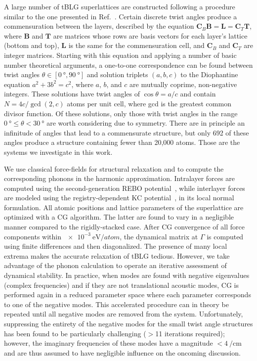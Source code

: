 \documentclass[prl,preprint]{revtex4}
\newcommand{\wavenumber}{\per\cm}
\newcommand{\mat}[1]{\mathbf{#1}}
\begin{document}
A large number of tBLG superlattices are constructed following a procedure similar to the one presented in Ref.~.  Certain discrete twist angles produce a commensuration between the layers, described by the equation $\mat C_B \mat B = \mat L = \mat C_T \mat T$, where $\mat B$ and $\mat T$ are matrices whose rows are basis vectors for each layer's lattice (bottom and top), $\mat L$ is the same for the commensuration cell, and $\mat C_B$ and $\mat C_T$ are integer matrices. Starting with this equation and applying a number of basic number theoretical arguments, a one-to-one correspondence can be found between twist angles $\theta \in \left[\SI{0}{\degree}, \SI{90}{\degree}\right]$ and solution triplets $(a, b, c)$ to the Diophantine equation $a^2 + 3b^2 = c^2$, where $a$, $b$, and $c$ are mutually coprime, non-negative integers. These solutions have twist angles of $\cos \theta=a/c$ and contain $N=4c/\gcd(2, c)$ atoms per unit cell, where gcd is the greatest common divisor function. Of these solutions, only those with twist angles in the range $\SI{0}{\degree} \leq \theta < \SI{30}{\degree}$ are worth considering due to symmetry. There are in principle an infinitude of angles that lead to a commensurate structure, but only 692 of these angles produce a structure containing fewer than 20,000 atoms. Those are the systems we investigate in this work.

We use classical force-fields for structural relaxation and to compute the corresponding phonons in the harmonic approximation. Intralayer forces are computed using the second-generation REBO potential~\cite{brenner2002SecondgenerationReactiveEmpirical}, while interlayer forces are modeled using the registry-dependent \gls{KC} potential~\cite{kolmogorov2005RegistrydependentInterlayerPotential}, in its local normal formulation. All atomic positions and lattice parameters of the superlattice are optimized with a \gls{CG} algorithm. The latter are found to vary in a negligible manner compared to the rigidly-stacked case.  After CG convergence of all force components within $\SI{e-3}{\eV\per atom}$, the dynamical matrix at $\Gamma$ is computed using finite differences and then diagonalized. The presence of many local extrema makes the accurate relaxation of tBLG tedious. However, we take advantage of the phonon calculation to operate an iterative assessment of dynamical stability. In practice, when modes are found with negative eigenvalues (complex frequencies) and if they are not translational acoustic modes, CG is performed again in a reduced parameter space where each parameter corresponds to one of the negative modes. This accelerated procedure can in theory be repeated until all negative modes are removed from the system. Unfortunately, suppressing the entirety of the negative modes for the small twist angle structures has been found to be particularly challenging ($>$11 iterations required); however, the imaginary frequencies of these modes have a magnitude $<\SI{4}{\wavenumber}$ and are thus assumed to have negligible influence on the oncoming discussion.
\end{document}
